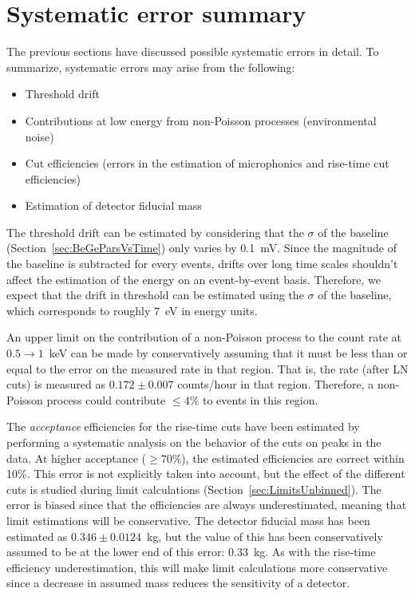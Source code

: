 
	\section{Systematic error summary}
	\label{sec:BeGeSysError}
	
	The previous sections have discussed possible systematic errors in detail.  To summarize, systematic errors may arise from the following:
		\begin{itemize}
			\item Threshold drift 
			\item Contributions at low energy from non-Poisson processes (environmental noise)			
			\item Cut efficiencies (errors in the estimation of microphonics and rise-time cut efficiencies)
			\item Estimation of detector fiducial mass
		\end{itemize}
		
	The threshold drift can be estimated by considering that the $\sigma$ of the baseline (Section~\ref{sec:BeGeParsVsTime}) only varies by 0.1~mV.  Since the magnitude of the baseline is subtracted for every events, drifts over long time scales shouldn't affect the estimation of the energy on an event-by-event basis.  Therefore, we expect that the drift in threshold can be estimated using the $\sigma$ of the baseline, which corresponds to roughly 7~eV in energy units.  
	
	An upper limit on the contribution of a non-Poisson process to the count rate at $0.5\to1$~keV can be made by conservatively assuming that it must be less than or equal to the error on the measured rate in that region.  That is, the rate (after LN cuts) is measured as $0.172\pm0.007$ counts/hour in that region.  Therefore, a non-Poisson process could contribute $\leq4$\% to events in this region.  	
	
	The \emph{acceptance} efficiencies for the rise-time cuts have been estimated by performing a systematic analysis on the behavior of the cuts on peaks in the data.  At higher acceptance ($\geq70$\%), the estimated efficiencies are correct within 10\%.  This error is not explicitly taken into account, but the effect of the different cuts is studied during limit calculations (Section~\ref{sec:LimitsUnbinned}).  The error is biased since that the efficiencies are always underestimated, meaning that limit estimations will be conservative.  The detector fiducial mass has been estimated as $0.346\pm0.0124$~kg, but the value of this has been conservatively assumed to be at the lower end of this error: 0.33~kg.  As with the rise-time efficiency underestimation, this will make limit calculations more conservative since a decrease in assumed mass reduces the sensitivity of a detector.  
	
